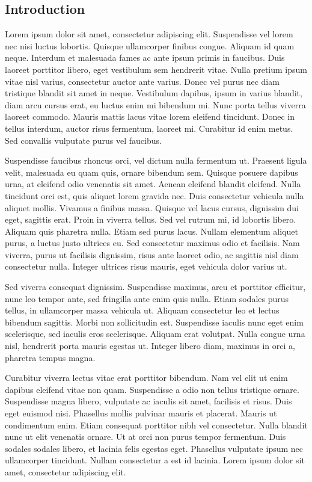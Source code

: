 \documentclass[10pt]{article}
\begin{document}
\begin{multicols}{2}
{}

\vspace{1em}

\section{Introduction}
Lorem ipsum dolor sit amet, consectetur adipiscing elit. Suspendisse vel lorem nec nisi luctus lobortis. Quisque ullamcorper finibus congue. Aliquam id quam neque. Interdum et malesuada fames ac ante ipsum primis in faucibus. Duis laoreet porttitor libero, eget vestibulum sem hendrerit vitae. Nulla pretium ipsum vitae nisl varius, consectetur auctor ante varius. Donec vel purus nec diam tristique blandit sit amet in neque. Vestibulum dapibus, ipsum in varius blandit, diam arcu cursus erat, eu luctus enim mi bibendum mi. Nunc porta tellus viverra laoreet commodo. Mauris mattis lacus vitae lorem eleifend tincidunt. Donec in tellus interdum, auctor risus fermentum, laoreet mi. Curabitur id enim metus. Sed convallis vulputate purus vel faucibus.

Suspendisse faucibus rhoncus orci, vel dictum nulla fermentum ut. Praesent ligula velit, malesuada eu quam quis, ornare bibendum sem. Quisque posuere dapibus urna, at eleifend odio venenatis sit amet. Aenean eleifend blandit eleifend. Nulla tincidunt orci est, quis aliquet lorem gravida nec. Duis consectetur vehicula nulla aliquet mollis. Vivamus a finibus massa. Quisque vel lacus cursus, dignissim dui eget, sagittis erat. Proin in viverra tellus. Sed vel rutrum mi, id lobortis libero. Aliquam quis pharetra nulla. Etiam sed purus lacus. Nullam elementum aliquet purus, a luctus justo ultrices eu. Sed consectetur maximus odio et facilisis. Nam viverra, purus ut facilisis dignissim, risus ante laoreet odio, ac sagittis nisl diam consectetur nulla. Integer ultrices risus mauris, eget vehicula dolor varius ut.

Sed viverra consequat dignissim. Suspendisse maximus, arcu et porttitor efficitur, nunc leo tempor ante, sed fringilla ante enim quis nulla. Etiam sodales purus tellus, in ullamcorper massa vehicula ut. Aliquam consectetur leo et lectus bibendum sagittis. Morbi non sollicitudin est. Suspendisse iaculis nunc eget enim scelerisque, sed iaculis eros scelerisque. Aliquam erat volutpat. Nulla congue urna nisl, hendrerit porta mauris egestas ut. Integer libero diam, maximus in orci a, pharetra tempus magna.

Curabitur viverra lectus vitae erat porttitor bibendum. Nam vel elit ut enim dapibus eleifend vitae non quam. Suspendisse a odio non tellus tristique ornare. Suspendisse magna libero, vulputate ac iaculis sit amet, facilisis et risus. Duis eget euismod nisi. Phasellus mollis pulvinar mauris et placerat. Mauris ut condimentum enim. Etiam consequat porttitor nibh vel consectetur. Nulla blandit nunc ut elit venenatis ornare. Ut at orci non purus tempor fermentum. Duis sodales sodales libero, et lacinia felis egestas eget. Phasellus vulputate ipsum nec ullamcorper tincidunt. Nullam consectetur a est id lacinia. Lorem ipsum dolor sit amet, consectetur adipiscing elit.


\end{multicols}
\end{document}
